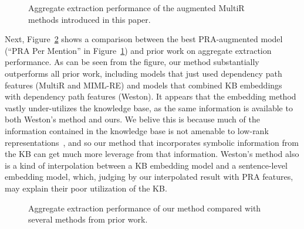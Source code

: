 \documentclass[11pt,a4paper]{article}
\newcommand{\figref}[1]{Figure~\ref{fig:#1}}
\begin{document}
\begin{figure}
  \centering
  \caption{Aggregate extraction performance of the augmented MultiR methods
  introduced in this paper.}
  \label{fig:our-comparison}
\end{figure}

Next, \figref{prior-work-comparison} shows a comparison between the best
PRA-augmented model (``PRA Per Mention'' in \figref{our-comparison}) and prior
work on aggregate extraction performance.  As can be seen from the figure, our
method substantially outperforms all prior work, including models that just
used dependency path features (MultiR and MIML-RE) and models that combined KB
embeddings with dependency path features (Weston).  It appears that the
embedding method vastly under-utilizes the knowledge base, as the same
information is available to both Weston's method and ours.  We belive this is
because much of the information contained in the knowledge base is not amenable
to low-rank representations~\cite{nickel-2014-are}, and so our method that
incorporates symbolic information from the KB can get much more leverage from
that information.  Weston's method also is a kind of interpolation between a KB
embedding model and a sentence-level embedding model, which, judging by our
interpolated result with PRA features, may explain their poor utilization of
the KB.

\begin{figure}
  \centering
  \caption{Aggregate extraction performance of our method compared with several
  methods from prior work.}
  \label{fig:prior-work-comparison}
\end{figure}
\end{document}
